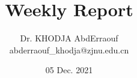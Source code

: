 \documentclass[a4paper]{article}
\title{Weekly Report}
\author{Dr. KHODJA AbdErraouf \\ abderraouf\_khodja@zjnu.edu.cn}
\date{05 Dec. 2021}
\begin{document}
\maketitle




\pagebreak


\end{document}
